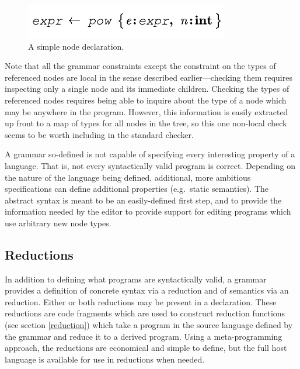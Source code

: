 \begin{figure}
	\centering

	\includegraphics[scale=1.0]{src/image/pow.pdf}	
	
	\caption{A simple node declaration.}
	\label{fig-attrs}
\end{figure}

Note that all the grammar constraints except the constraint on the types of referenced nodes are local in the sense described earlier---checking them requires inspecting only a single node and its immediate children. Checking the types of referenced nodes requires being able to inquire about the type of a node which may be anywhere in the program. However, this information is easily extracted up front to a map of types for all nodes in the tree, so this one non-local check seems to be worth including in the standard checker.

A grammar so-defined is not capable of specifying every interesting property of a language. That is, not every syntactically valid program is correct. Depending on the nature of the language being defined, additional, more ambitious specifications can define additional properties (e.g.\ static semantics). The abstract syntax is meant to be an easily-defined first step, and to provide the information needed by the editor to provide support for editing programs which use arbitrary new node types.


\subsection{Reductions}
In addition to defining what programs are syntactically valid, a grammar provides a definition of concrete syntax via a  reduction and of semantics via an  reduction. Either or both reductions may be present in a declaration. These reductions are code fragments which are used to construct reduction functions (see section \ref{reduction}) which take a program in the source language defined by the grammar and reduce it to a derived program. Using a meta-programming approach, the reductions are economical and simple to define, but the full host language is available for use in reductions when needed.


